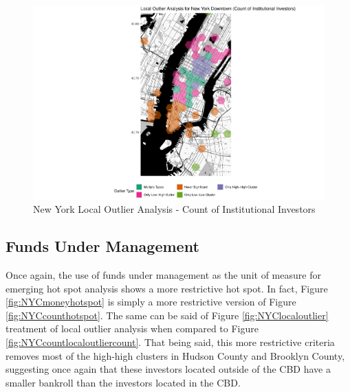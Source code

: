 \begin{figure}
	\centering
	\includegraphics[width=1\linewidth]{Figures/ChapterIV/NY_Count_LO_Downtown}
	\caption[Downtown New York Local Outlier Analysis - Count of Institutional Investors 1999-2018]{New York Local Outlier Analysis - Count of Institutional Investors}
	\label{fig:NYCcountlocaloutliercount_Downtown}
\end{figure}
\subsection{Funds Under Management}

Once again, the use of funds under management as the unit of measure for emerging hot spot analysis shows a more restrictive hot spot. In fact, Figure \ref{fig:NYCmoneyhotspot} is simply a more restrictive version of Figure \ref{fig:NYCcounthotspot}.  The same can be said of Figure \ref{fig:NYClocaloutlier} treatment of local outlier analysis when compared to Figure \ref{fig:NYCcountlocaloutliercount}.  That being said, this more restrictive criteria removes most of the high-high clusters in Hudson County and Brooklyn County, suggesting once again that these investors located outside of the CBD have a smaller bankroll than the investors located in the CBD.   

